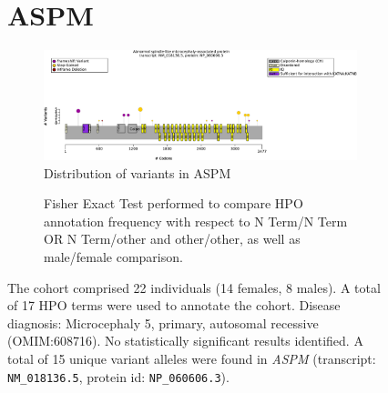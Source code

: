 \begin{figure}[htbp]
\section*{ASPM}
\centering
\begin{subfigure}[b]{0.95\textwidth}
\centering
\includegraphics[width=\textwidth]{ img/ASPM_protein_diagram.pdf} 
\captionsetup{justification=raggedright,singlelinecheck=false}
\caption{Distribution of variants in ASPM}
\end{subfigure}

\vspace{2em}

\begin{subfigure}[b]{0.95\textwidth}
\centering
{}
\captionsetup{justification=raggedright,singlelinecheck=false}
\caption{Fisher Exact Test performed to compare HPO annotation frequency with respect to N Term/N Term OR N Term/other and other/other, as well as male/female comparison. }
\end{subfigure}

\vspace{2em}

\caption{ The cohort comprised 22 individuals (14 females, 8 males). A total of 17 HPO terms were used to annotate the cohort. Disease diagnosis: Microcephaly 5, primary, autosomal recessive (OMIM:608716). No statistically significant results identified. A total of 15 unique variant alleles were found in \textit{ASPM} (transcript: \texttt{NM\_018136.5}, protein id: \texttt{NP\_060606.3}).}
\end{figure}

